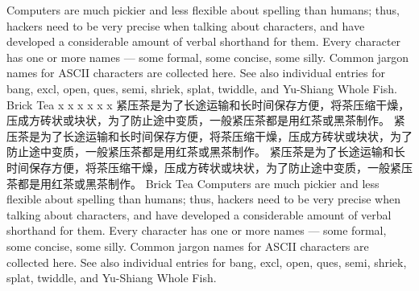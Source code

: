 \documentclass{article}
\newcommand{\cn}{\mktsFontfileSunexta}
\begin{document}
\begin{multicols}{3}

Computers are much pickier and less flexible about spelling than humans; thus, hackers need to be very precise when talking about characters, and have developed a considerable amount of verbal shorthand for them. Every character has one or more names — some formal, some concise, some silly. Common jargon names for ASCII characters are collected here. See also individual entries for bang, excl, open, ques, semi, shriek, splat, twiddle, and Yu-Shiang Whole Fish.
Brick Tea
{\cn{}x x x x x x
紧压茶是为了长途运输和长时间保存方便，将茶压缩干燥，压成方砖状或块状，为了防止途中变质，一般紧压茶都是用红茶或黑茶制作。
紧压茶是为了长途运输和长时间保存方便，将茶压缩干燥，压成方砖状或块状，为了防止途中变质，一般紧压茶都是用红茶或黑茶制作。
紧压茶是为了长途运输和长时间保存方便，将茶压缩干燥，压成方砖状或块状，为了防止途中变质，一般紧压茶都是用红茶或黑茶制作。
}
Brick Tea Computers are much pickier and less flexible about spelling than humans; thus, hackers need to be very precise when talking about characters, and have developed a considerable amount of verbal shorthand for them. Every character has one or more names — some formal, some concise, some silly. Common jargon names for ASCII characters are collected here. See also individual entries for bang, excl, open, ques, semi, shriek, splat, twiddle, and Yu-Shiang Whole Fish.



\end{multicols}
\end{document}
